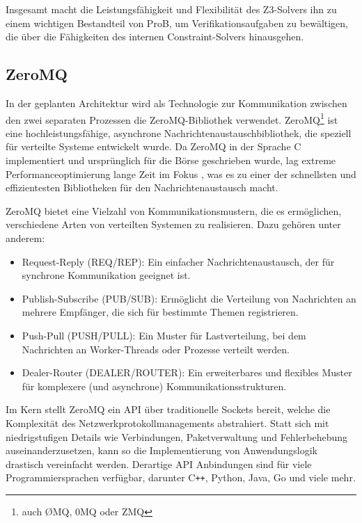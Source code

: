 Insgesamt macht die Leistungsfähigkeit und Flexibilität des Z3-Solvers ihn zu einem wichtigen Bestandteil von ProB,
um Verifikationsaufgaben zu bewältigen, die über die Fähigkeiten des internen Constraint-Solvers hinausgehen.


\subsection{ZeroMQ}
\label{sec:zeromq}

In der geplanten Architektur wird als Technologie zur Kommunikation zwischen den zwei separaten Prozessen die ZeroMQ-Bibliothek \cite{hintjens2013zeromq} verwendet.
ZeroMQ\footnote{auch ØMQ, 0MQ oder ZMQ} ist eine hochleistungsfähige, asynchrone Nachrichtenaustauschbibliothek, die speziell für verteilte Systeme entwickelt wurde.
Da ZeroMQ in der Sprache C implementiert und ursprünglich für die Börse geschrieben wurde, lag extreme Performanceoptimierung lange Zeit im Fokus \cite{sustrik2015zeromq},
was es zu einer der schnellsten und effizientesten Bibliotheken für den Nachrichtenaustausch macht.

ZeroMQ bietet eine Vielzahl von Kommunikationsmustern, die es ermöglichen, verschiedene Arten von verteilten Systemen zu realisieren.
Dazu gehören unter anderem:

\begin{itemize}
    \item Request-Reply (REQ/REP): Ein einfacher Nachrichtenaustausch, der für synchrone Kommunikation geeignet ist.
    \item Publish-Subscribe (PUB/SUB): Ermöglicht die Verteilung von Nachrichten an mehrere Empfänger, die sich für bestimmte Themen registrieren.
    \item Push-Pull (PUSH/PULL): Ein Muster für Lastverteilung, bei dem Nachrichten an Worker-Threads oder Prozesse verteilt werden.
    \item Dealer-Router (DEALER/ROUTER): Ein erweiterbares und flexibles Muster für komplexere (und asynchrone) Kommunikationsstrukturen.
\end{itemize}

Im Kern stellt ZeroMQ ein API über traditionelle Sockets bereit, welche die Komplexität des Netzwerkprotokollmanagements abstrahiert.
Statt sich mit niedrigstufigen Details wie Verbindungen, Paketverwaltung und Fehlerbehebung auseinanderzusetzen, kann so die Implementierung von Anwendungslogik drastisch vereinfacht werden.
Derartige API Anbindungen sind für viele Programmiersprachen verfügbar, darunter C\texttt{++}, Python, Java, Go und viele mehr.

